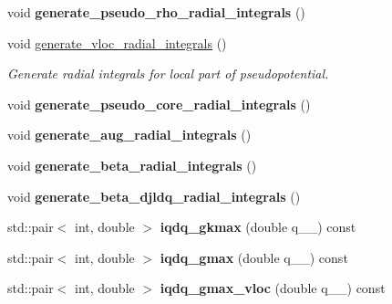 \begin{DoxyCompactItemize}
\item 
\hypertarget{classsirius_1_1_radial__integrals_a3d41ce80d8bf3d2371dabc91cc7257be}{}void {\bfseries generate\+\_\+pseudo\+\_\+rho\+\_\+radial\+\_\+integrals} ()\label{classsirius_1_1_radial__integrals_a3d41ce80d8bf3d2371dabc91cc7257be}

\item 
void \hyperlink{classsirius_1_1_radial__integrals_a940bd94d64a2348ff11065e62c0b1101}{generate\+\_\+vloc\+\_\+radial\+\_\+integrals} ()
\begin{DoxyCompactList}\small\item\em Generate radial integrals for local part of pseudopotential. \end{DoxyCompactList}\item 
\hypertarget{classsirius_1_1_radial__integrals_a5b0c6c2988f4f8915a50290cfcdd1eb3}{}void {\bfseries generate\+\_\+pseudo\+\_\+core\+\_\+radial\+\_\+integrals} ()\label{classsirius_1_1_radial__integrals_a5b0c6c2988f4f8915a50290cfcdd1eb3}

\item 
\hypertarget{classsirius_1_1_radial__integrals_a1b70d6df610d230d9b2d9d1a1ae4befd}{}void {\bfseries generate\+\_\+aug\+\_\+radial\+\_\+integrals} ()\label{classsirius_1_1_radial__integrals_a1b70d6df610d230d9b2d9d1a1ae4befd}

\item 
\hypertarget{classsirius_1_1_radial__integrals_ab25cabd221782af5f8943a212a38747f}{}void {\bfseries generate\+\_\+beta\+\_\+radial\+\_\+integrals} ()\label{classsirius_1_1_radial__integrals_ab25cabd221782af5f8943a212a38747f}

\item 
\hypertarget{classsirius_1_1_radial__integrals_a2e1ea8fe6d9ad472d8c58369ddfaa00b}{}void {\bfseries generate\+\_\+beta\+\_\+djldq\+\_\+radial\+\_\+integrals} ()\label{classsirius_1_1_radial__integrals_a2e1ea8fe6d9ad472d8c58369ddfaa00b}

\item 
\hypertarget{classsirius_1_1_radial__integrals_a185746026a3e96dc04685fb846ec6b8a}{}std\+::pair$<$ int, double $>$ {\bfseries iqdq\+\_\+gkmax} (double q\+\_\+\+\_\+) const \label{classsirius_1_1_radial__integrals_a185746026a3e96dc04685fb846ec6b8a}

\item 
\hypertarget{classsirius_1_1_radial__integrals_a07a6557f05cef99cb321f9138defa6b9}{}std\+::pair$<$ int, double $>$ {\bfseries iqdq\+\_\+gmax} (double q\+\_\+\+\_\+) const \label{classsirius_1_1_radial__integrals_a07a6557f05cef99cb321f9138defa6b9}

\item 
\hypertarget{classsirius_1_1_radial__integrals_a71e6c8ed2bed88896a67a6aeeb67c5ee}{}std\+::pair$<$ int, double $>$ {\bfseries iqdq\+\_\+gmax\+\_\+vloc} (double q\+\_\+\+\_\+) const \label{classsirius_1_1_radial__integrals_a71e6c8ed2bed88896a67a6aeeb67c5ee}

\end{DoxyCompactItemize}
